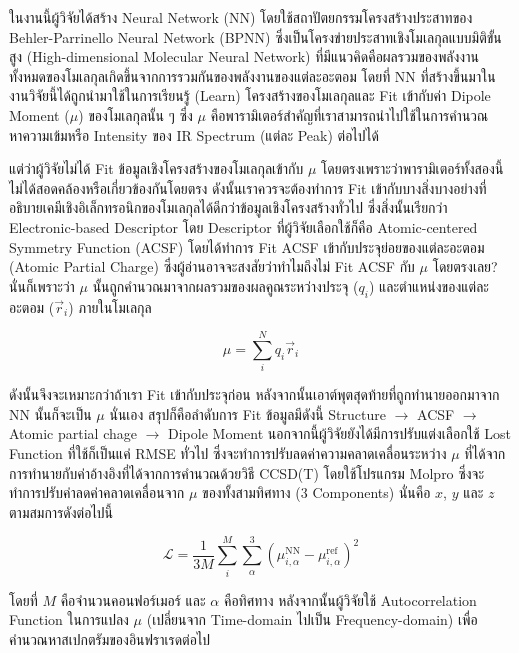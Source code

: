 ในงานนี้ผู้วิจัยได้สร้าง Neural Network (NN) โดยใช้สถาปัตยกรรมโครงสร้างประสาทของ Behler-Parrinello Neural Network (BPNN)
\autocite{behler2007,behler2011b,behler2015} ซึ่งเป็นโครงข่ายประสาทเชิงโมเลกุลแบบมิติขั้นสูง (High-dimensional Molecular 
Neural Network) ที่มีแนวคิดคือผลรวมของพลังงานทั้งหมดของโมเลกุลเกิดขึ้นจากการรวมกันของพลังงานของแต่ละอะตอม โดยที่ NN ที่สร้างขึ้นมาใน%
งานวิจัยนี้ได้ถูกนำมาใช้ในการเรียนรู้ (Learn) โครงสร้างของโมเลกุลและ Fit เข้ากับค่า Dipole Moment ($\mu$) ของโมเลกุลนั้น ๆ ซึ่ง 
$\mu$ คือพารามิเตอร์สำคัญที่เราสามารถนำไปใช้ในการคำนวณหาความเข้มหรือ Intensity ของ IR Spectrum (แต่ละ Peak) ต่อไปได้

แต่ว่าผู้วิจัยไม่ได้ Fit ข้อมูลเชิงโครงสร้างของโมเลกุลเข้ากับ $\mu$ โดยตรงเพราะว่าพารามิเตอร์ทั้งสองนี้ไม่ได้สอดคล้องหรือเกี่ยวข้องกันโดยตรง 
ดังนั้นเราควรจะต้องทำการ Fit เข้ากับบางสิ่งบางอย่างที่อธิบายเคมีเชิงอิเล็กทรอนิกของโมเลกุลได้ดีกว่าข้อมูลเชิงโครงสร้างทั่วไป ซึ่งสิ่งนั้นเรียกว่า 
Electronic-based Descriptor โดย Descriptor ที่ผู้วิจัยเลือกใช้ก็คือ Atomic-centered Symmetry Function (ACSF) โดยได้ทำการ 
Fit ACSF เข้ากับประจุย่อยของแต่ละอะตอม (Atomic Partial Charge) ซึ่งผู้อ่านอาจจะสงสัยว่าทำไมถึงไม่ Fit ACSF กับ $\mu$ โดยตรงเลย? 
นั่นก็เพราะว่า $\mu$ นั้นถูกคำนวณมาจากผลรวมของผลคูณระหว่างประจุ ($q_{i}$) และตำแหน่งของแต่ละอะตอม ($\vec{r}_{i}$) ภายในโมเลกุล

\begin{equation}
    \mu = \sum^{N}_{i} q_{i}\vec{r}_{i}
\end{equation}

ดังนั้นจึงจะเหมาะกว่าถ้าเรา Fit เข้ากับประจุก่อน หลังจากนั้นเอาต์พุตสุดท้ายที่ถูกทำนายออกมาจาก NN นั้นก็จะเป็น $\mu$ นั่นเอง สรุปก็คือลำดับการ 
Fit ข้อมูลมีดังนี้ Structure $\rightarrow$ ACSF $\rightarrow$ Atomic partial chage $\rightarrow$ Dipole Moment 
นอกจากนี้ผู้วิจัยยังได้มีการปรับแต่งเลือกใช้ Lost Function ที่ใช้ก็เป็นแค่ RMSE ทั่วไป ซึ่งจะทำการปรับลดค่าความคลาดเคลื่อนระหว่าง $\mu$ 
ที่ได้จากการทำนายกับค่าอ้างอิงที่ได้จากการคำนวณด้วยวิธี CCSD(T) โดยใช้โปรแกรม Molpro ซึ่งจะทำการปรับค่าลดค่าคลาดเคลื่อนจาก $\mu$ 
ของทั้งสามทิศทาง (3 Components) นั่นคือ $x$, $y$ และ $z$ ตามสมการดังต่อไปนี้

\begin{equation}
    \mathcal{L} = \frac{1}{3M} \sum^{M}_{i} \sum^{3}_{\alpha} (\mu^{\text{NN}}_{i,\alpha} - \mu^{\text{ref}}_{i,\alpha})^{2}
\end{equation}

\noindent โดยที่ $M$ คือจำนวนคอนฟอร์เมอร์ และ $\alpha$ คือทิศทาง หลังจากนั้นผู้วิจัยใช้ Autocorrelation Function ในการแปลง 
$\mu$ (เปลี่ยนจาก Time-domain ไปเป็น Frequency-domain) เพื่อคำนวณหาสเปกตรัมของอินฟราเรดต่อไป 

